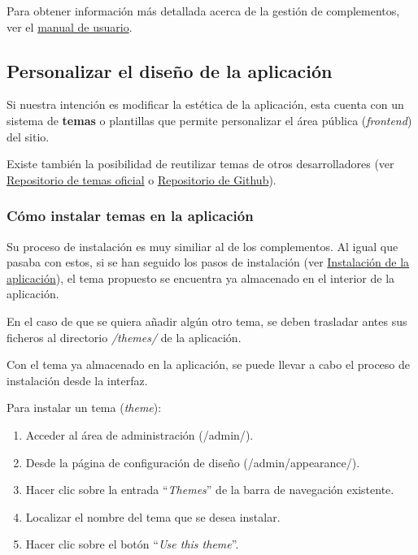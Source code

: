 Para obtener información más detallada acerca de la gestión de
complementos, ver el
\href{https://tfg-ceniehariadne.readthedocs.io/es/latest/anexos/E_Manual_usuario.html\#manual-de-usuario}{manual
de usuario}.

\subsection{Personalizar el diseño de la aplicación}

Si nuestra intención es modificar la estética de la aplicación, esta
cuenta con un sistema de \textbf{temas} o plantillas que permite
personalizar el área pública (\emph{frontend}) del sitio.

Existe también la posibilidad de reutilizar temas de otros
desarrolladores (ver
\href{https://omeka.org/classic/themes/}{Repositorio de temas oficial} o
\href{https://daniel-km.github.io/UpgradeToOmekaS/omeka_themes.html}{Repositorio
de Github}).

\subsubsection{Cómo instalar temas en la aplicación}

Su proceso de instalación es muy similiar al de los complementos. Al
igual que pasaba con estos, si se han seguido los pasos de instalación
(ver \protect\hyperlink{instalaciuxf3n-de-la-aplicaciuxf3n}{Instalación
de la aplicación}), el tema propuesto se encuentra ya almacenado en el
interior de la aplicación.

En el caso de que se quiera añadir algún otro tema, se deben trasladar
antes sus ficheros al directorio \emph{/themes/} de la aplicación.

Con el tema ya almacenado en la aplicación, se puede llevar a cabo el
proceso de instalación desde la interfaz.

Para instalar un tema (\emph{theme}):

\begin{enumerate}
\def\labelenumi{\arabic{enumi}.}
\tightlist
\item
  Acceder al área de administración ({/admin/}).
\item
  Desde la página de configuración de diseño
  ({/admin/appearance/}).
\item
  Hacer clic sobre la entrada ``\emph{Themes}'' de la barra de navegación
  existente.
\item
  Localizar el nombre del tema que se desea instalar.
\item
  Hacer clic sobre el botón ``\emph{Use this theme}''.
\end{enumerate}

